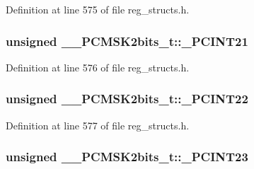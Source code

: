 Definition at line 575 of file reg\+\_\+structs.\+h.

\hypertarget{union_____p_c_m_s_k2bits__t_a1a9b6f182ea818f2885a3f2837c8747a}{
\subsubsection[{\+\_\+\+P\+C\+I\+N\+T21}]{\setlength{\rightskip}{0pt plus 5cm}unsigned \+\_\+\+\_\+\+P\+C\+M\+S\+K2bits\+\_\+t\+::\+\_\+\+P\+C\+I\+N\+T21}}\label{union_____p_c_m_s_k2bits__t_a1a9b6f182ea818f2885a3f2837c8747a}


Definition at line 576 of file reg\+\_\+structs.\+h.

\hypertarget{union_____p_c_m_s_k2bits__t_ae253cf79ac718fabffaeb578522dc83c}{
\subsubsection[{\+\_\+\+P\+C\+I\+N\+T22}]{\setlength{\rightskip}{0pt plus 5cm}unsigned \+\_\+\+\_\+\+P\+C\+M\+S\+K2bits\+\_\+t\+::\+\_\+\+P\+C\+I\+N\+T22}}\label{union_____p_c_m_s_k2bits__t_ae253cf79ac718fabffaeb578522dc83c}


Definition at line 577 of file reg\+\_\+structs.\+h.

\hypertarget{union_____p_c_m_s_k2bits__t_a6d866e16300c70f880317d5aea287ac1}{
\subsubsection[{\+\_\+\+P\+C\+I\+N\+T23}]{\setlength{\rightskip}{0pt plus 5cm}unsigned \+\_\+\+\_\+\+P\+C\+M\+S\+K2bits\+\_\+t\+::\+\_\+\+P\+C\+I\+N\+T23}}\label{union_____p_c_m_s_k2bits__t_a6d866e16300c70f880317d5aea287ac1}


